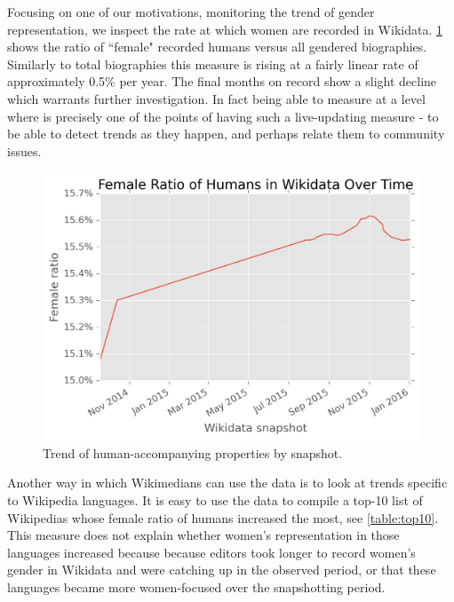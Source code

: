 \documentclass{sigchi-ext}
\begin{document}
Focusing on one of our motivations, monitoring the trend of gender representation, we inspect the rate at which women are recorded in Wikidata. \ref{fig:frb} shows the ratio of ``female" recorded humans versus all gendered biographies. Similarly to total biographies this measure is rising at a fairly linear rate of approximately 0.5\% per year. The final months on record show a slight decline which warrants further investigation. In fact being able to measure at a level where is precisely one of the points of having such a live-updating measure - to be able to detect trends as they happen, and perhaps relate them to community issues. 

\begin{figure}
\label{fig:frb}
\includegraphics[scale=0.6]{figures/frbwikidata.png} 
\caption{Trend of human-accompanying properties by snapshot.}
\end{figure}

Another way in which Wikimedians can use the data is to look at trends specific to Wikipedia languages. It is easy to use the data to compile a top-10 list of Wikipedias whose female ratio of humans increased the most, see \ref{table:top10}. This measure does not explain whether women's representation in those languages increased because because editors took longer to record women's gender in Wikidata and were catching up in the observed period, or that these languages became more women-focused over the snapshotting period.
\end{document}
